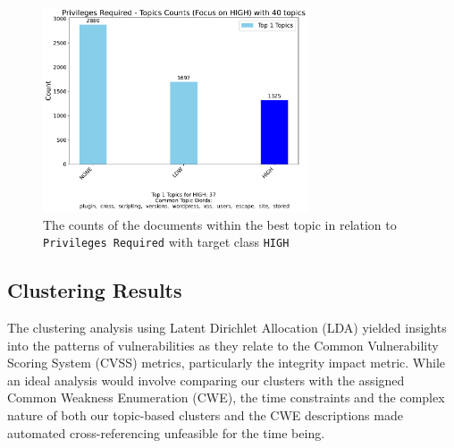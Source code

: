 \documentclass[12pt]{article}
\begin{document}

\begin{figure}[H]
	\centering
	\includegraphics[width=0.7\textwidth]{figures/privilegesRequired/merged_top_k_topics_category_focus_counts_privilegesRequired_HIGH_k1.pdf}

	\caption{The counts of the documents within the best topic in relation to \texttt{Privileges Required} with
		target class \texttt{HIGH}}

	\label{fig:priviledgesRequired_BAD}
\end{figure}




\subsection{Clustering Results}

The clustering analysis using Latent Dirichlet Allocation (LDA) yielded insights into the patterns
of vulnerabilities as they relate to the Common Vulnerability Scoring System (CVSS) metrics,
particularly the integrity impact metric. While an ideal analysis would involve comparing our
clusters with the assigned Common Weakness Enumeration (CWE), the time constraints and the complex
nature of both our topic-based clusters and the CWE descriptions made automated cross-referencing
unfeasible for the time being.
\end{document}
